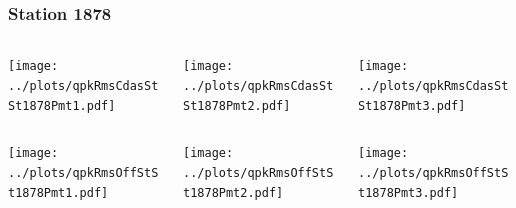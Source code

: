 \documentclass[aspectratio=169]{beamer}
\begin{document}
\begin{frame} 
  \frametitle{Station 1878}
  \begin{center}
    \begin{columns}
      \begin{column}{0.33\textwidth}
        \texttt{[image: ../plots/qpkRmsCdasStSt1878Pmt1.pdf]}
      \end{column}
      \begin{column}{0.33\textwidth}
        \texttt{[image: ../plots/qpkRmsCdasStSt1878Pmt2.pdf]}
      \end{column}
      \begin{column}{0.33\textwidth}
        \texttt{[image: ../plots/qpkRmsCdasStSt1878Pmt3.pdf]}
      \end{column}
    \end{columns}
  \end{center}

  \begin{center}
    \begin{columns}
      \begin{column}{0.33\textwidth}
        \texttt{[image: ../plots/qpkRmsOffStSt1878Pmt1.pdf]}
      \end{column}
      \begin{column}{0.33\textwidth}
        \texttt{[image: ../plots/qpkRmsOffStSt1878Pmt2.pdf]}
      \end{column}
      \begin{column}{0.33\textwidth}
        \texttt{[image: ../plots/qpkRmsOffStSt1878Pmt3.pdf]}
      \end{column}
    \end{columns}
  \end{center}
\end{frame}
\end{document}
